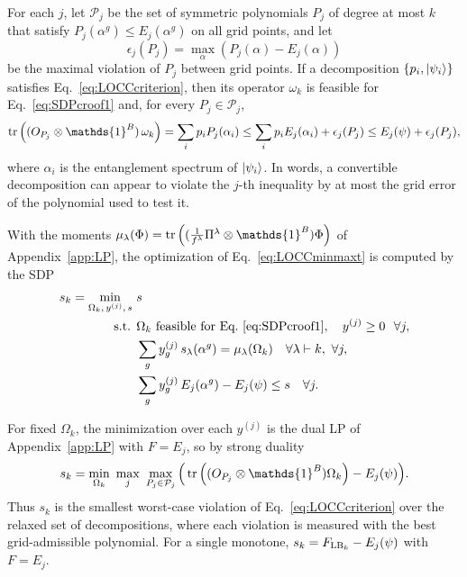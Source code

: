 \documentclass[aps,pra,twocolumn,superscriptaddress]{revtex4-2}
\newcommand{\one}{\mathds{1}}
\newcommand{\I}{\one}
\renewcommand{\a}{\alpha}
\begin{document}
\begin{widetext}
For each $j$, let $\mathcal{P}_j$ be the set of symmetric polynomials $P_j$ of degree at most $k$ that satisfy $P_j(\a^g)\leq E_j(\a^g)$ on all grid points, and let
\begin{equation}
    \epsilon_j(P_j)=\max_{\a}\left(P_j(\a)-E_j(\a)\right)
\end{equation}
be the maximal violation of $P_j$ between grid points. If a decomposition $\{p_i,\ket{\psi_i}\}$ satisfies Eq.~\eqref{eq:LOCCcriterion}, then its operator $\omega_{k}$ is feasible for Eq.~\eqref{eq:SDPcroof1} and, for every $P_j\in\mathcal{P}_j$,
\begin{equation}\label{eq:LOCCnecessary}
    \tr\left((O_{P_j}\otimes\I^B)\,\omega_{k}\right)=\sum_ip_iP_j(\a_i)\leq\sum_ip_iE_j(\a_i)+\epsilon_j(P_j)\leq E_j(\psi)+\epsilon_j(P_j),
\end{equation}
where $\a_i$ is the entanglement spectrum of $\ket{\psi_i}$. In words, a convertible decomposition can appear to violate the $j$-th inequality by at most the grid error of the polynomial used to test it.

With the moments $\mu_\lambda(\Phi)=\tr\left((\tfrac{1}{f^\lambda}\Pi^\lambda\otimes\I^B)\Phi\right)$ of Appendix~\ref{app:LP}, the optimization of Eq.~\eqref{eq:LOCCminmaxt} is computed by the SDP
\begin{align}\label{eq:LOCCsdp}
    s_k=\min_{\Omega_k,\,y^{(j)},\,s}\ & s\\
    \text{s.t. }& \Omega_k\ \text{feasible for Eq.~\eqref{eq:SDPcroof1}},\quad y^{(j)}\geq0\ \ \forall j, \nonumber\\
    & \sum_g y^{(j)}_g\,s_\lambda(\a^g)=\mu_\lambda(\Omega_k)\quad\forall\lambda\vdash k,\ \forall j, \nonumber\\
    & \sum_g y^{(j)}_g\,E_j(\a^g)-E_j(\psi)\leq s\quad\forall j. \nonumber
\end{align}

For fixed $\Omega_k$, the minimization over each $y^{(j)}$ is the dual LP of Appendix~\ref{app:LP} with $F=E_j$, so by strong duality
\begin{equation}\label{eq:LOCCminmax}
    s_k=\min_{\Omega_k}\ \max_{j}\ \max_{P_j\in\mathcal{P}_j}\Big(\tr\left((O_{P_j}\otimes\I^B) \Omega_k\right)-E_j(\psi)\Big).
\end{equation}
Thus $s_k$ is the smallest worst-case violation of Eq.~\eqref{eq:LOCCcriterion} over the relaxed set of decompositions, where each violation is measured with the best grid-admissible polynomial. For a single monotone, $s_k=F_{{\rm LB}_k}-E_j(\psi)$ with $F=E_j$.


\end{widetext}
\end{document}
